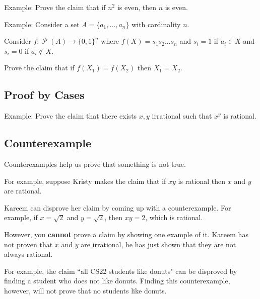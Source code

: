 \documentclass[12pt,letterpaper]{article}
\newcommand\Pow{\ensuremath{\operatorname{\mathcal{P}}}}
\begin{document}
    Example: Prove the claim that if $n^2$ is even, then $n$ is even.
    
    \begin{mdframed}\vspace{2 cm}\end{mdframed}
     
    Example: Consider a set $A = \{a_1,...,a_n\}$ with cardinality $n$.
        
    Consider $f: \Pow(A) \rightarrow \{0,1\}^n$ where $f(X) = s_1s_2...s_n$ and $s_i = 1$ if $a_i \in X$ and $s_i = 0$ if $a_i \not\in X$. 
    
    Prove the claim that if $f(X_1) = f(X_2)$ then $X_1 = X_2$. 
                
    \begin{mdframed}\vspace{2 cm}\end{mdframed}
    
    \subsection{Proof by Cases}
        
    Example: Prove the claim that there exists $x,y$ irrational such that $x^y$ is rational.
    \begin{mdframed}\vspace{2 cm}\end{mdframed}
    
    \subsection{Counterexample}
    
    Counterexamples help us prove that something is not true.

      For example, suppose Kristy makes the claim that if $xy$ is rational then $x$ and $y$ are rational.

      Kareem can disprove her claim by coming up with a counterexample. For example, if $x = \sqrt{2}$ and $y = \sqrt{2}$, then $xy = 2$, which is rational. 

      However, you \textbf{cannot} prove a claim by showing one example of it. Kareem has not proven that $x$ and $y$ are irrational, he has just shown that they are not always rational.

      For example, the claim ``all CS22 students like donuts" can be disproved by finding a student who does not like donuts. Finding this counterexample, however, will not prove that no students like donuts.
      
\end{document}
